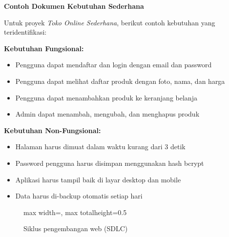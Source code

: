 \begin{contoh}
\textbf{Contoh Dokumen Kebutuhan Sederhana}

Untuk proyek \textit{Toko Online Sederhana}, berikut contoh kebutuhan yang teridentifikasi:

\textbf{Kebutuhan Fungsional:}
\begin{itemize}
  \item Pengguna dapat mendaftar dan login dengan email dan password
  \item Pengguna dapat melihat daftar produk dengan foto, nama, dan harga
  \item Pengguna dapat menambahkan produk ke keranjang belanja
  \item Admin dapat menambah, mengubah, dan menghapus produk
\end{itemize}

\textbf{Kebutuhan Non-Fungsional:}
\begin{itemize}
  \item Halaman harus dimuat dalam waktu kurang dari 3 detik
  \item Password pengguna harus disimpan menggunakan hash bcrypt
  \item Aplikasi harus tampil baik di layar desktop dan mobile
  \item Data harus di-backup otomatis setiap hari
\end{itemize}
\end{contoh}

\begin{figure}[htbp]
\centering
\begin{adjustbox}{max width=\textwidth, max totalheight=0.5\textheight}
\end{adjustbox}
\caption{Siklus pengembangan web (SDLC)}
\end{figure}

